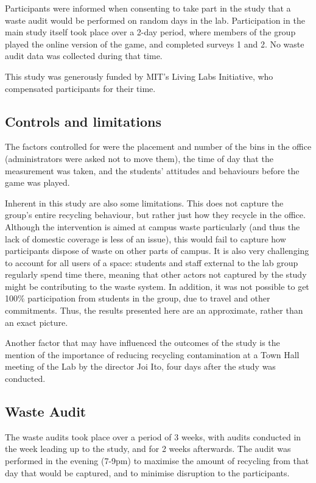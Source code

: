 \documentclass[nofonts,nols,justified,nobib]{tufte-book}
\begin{document}
Participants were informed when consenting to take part in the study that a waste audit would be performed on random days in the lab. Participation in the main study itself took place over a 2-day period, where members of the group played the online version of the game, and completed surveys 1 and 2. No waste audit data was collected during that time.

This study was generously funded by MIT's Living Labs Initiative, who compensated participants for their time.

\subsection*{Controls and limitations}
The factors controlled for were the placement and number of the bins in the office (administrators were asked not to move them), the time of day that the measurement was taken, and the students' attitudes and behaviours before the game was played.

Inherent in this study are also some limitations. This does not capture the group's entire recycling behaviour, but rather just how they recycle in the office. Although the intervention is aimed at campus waste particularly (and thus the lack of domestic coverage is less of an issue), this would fail to capture how participants dispose of waste on other parts of campus. It is also very challenging to account for all users of a space: students and staff external to the lab group regularly spend time there, meaning that other actors not captured by the study might be contributing to the waste system. In addition, it was not possible to get 100\% participation from students in the group, due to travel and other commitments. Thus, the results presented here are an approximate, rather than an exact picture.

Another factor that may have influenced the outcomes of the study is the mention of the importance of reducing recycling contamination at a Town Hall meeting of the Lab by the director Joi Ito, four days after the study was conducted.

\subsection*{Waste Audit}
The waste audits took place over a period of 3 weeks, with audits conducted in the week leading up to the study, and for 2 weeks afterwards. The audit was performed in the evening (7-9pm) to maximise the amount of recycling from that day that would be captured, and to minimise disruption to the participants.
\end{document}
